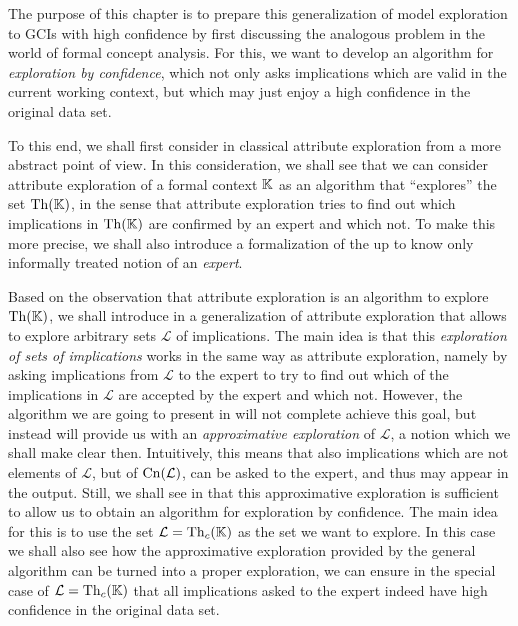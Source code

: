 The purpose of this chapter is to prepare this generalization of model exploration to GCIs
with high confidence by first discussing the analogous problem in the world of formal
concept analysis.  For this, we want to develop an algorithm for \emph{exploration by
  confidence}, which not only asks implications which are valid in the current working
context, but which may just enjoy a high confidence in the original data set.

To this end, we shall first consider in  classical attribute
exploration from a more abstract point of view.  In this consideration, we shall see that
we can consider attribute exploration of a formal context ${\mathbb{K}}$ as an algorithm that
\enquote{explores} the set $\operatorname{Th}({\mathbb{K}})$, in the sense that attribute exploration tries to
find out which implications in $\operatorname{Th}({\mathbb{K}})$ are confirmed by an expert and which not.  To
make this more precise, we shall also introduce a formalization of the up to know only
informally treated notion of an \emph{expert}.

Based on the observation that attribute exploration is an algorithm to explore $\operatorname{Th}({\mathbb{K}})$, we shall introduce in  a generalization of attribute
exploration that allows to explore arbitrary sets $\mathcal{L}$ of implications.  The main
idea is that this \emph{exploration of sets of implications} works in the same way as
attribute exploration, namely by asking implications from $\mathcal{L}$ to the expert to
try to find out which of the implications in $\mathcal{L}$ are accepted by the expert and
which not.  However, the algorithm we are going to present in 
will not complete achieve this goal, but instead will provide us with an
\emph{approximative exploration} of $\mathcal{L}$, a notion which we shall make clear
then.  Intuitively, this means that also implications which are not elements of
$\mathcal{L}$, but of $\operatorname{Cn}(\mathcal{L})$, can be asked to the expert, and thus may appear
in the output.  Still, we shall see in  that this approximative
exploration is sufficient to allow us to obtain an algorithm for exploration by
confidence.  The main idea for this is to use the set $\mathcal{L} = \operatorname{Th}_{c}({\mathbb{K}})$ as
the set we want to explore.  In this case we shall also see how the approximative
exploration provided by the general algorithm can be turned into a proper exploration, \ie
we can ensure in the special case of $\mathcal{L} = \operatorname{Th}_{c}({\mathbb{K}})$ that all implications
asked to the expert indeed have high confidence in the original data set.

